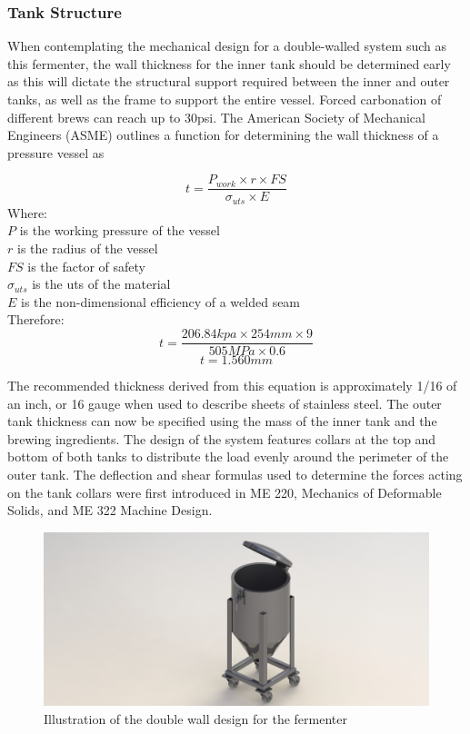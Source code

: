 \documentclass{article}
\begin{document}
\subsubsection{Tank Structure}
When contemplating the mechanical design for a double-walled system such as this fermenter, the wall thickness for the inner tank should be determined early as this will dictate the structural support required between the inner and outer tanks, as well as the frame to support the entire vessel. Forced carbonation of different brews can reach up to 30psi.  The American Society of Mechanical Engineers (ASME) outlines a function for determining the wall thickness of a pressure vessel as

\begin{equation}
t = \frac{P_{work} \times r \times FS}{\sigma_{uts} \times E}
\end{equation}
\noindent Where: \\
$P$ is the working pressure of the vessel\\
$r$ is the radius of the vessel\\
$FS$ is the factor of safety\\
$­\sigma_{uts}$ is the \gls{uts} of the material\\
$E$ is the non-dimensional efficiency of a welded seam\\

\noindent Therefore:
\begin{equation}
t = \frac{206.84kpa \times 254mm \times 9}{505MPa \times 0.6}
\end{equation}
\begin{equation}
t = 1.560mm
\end{equation}

The recommended thickness derived from this equation is approximately 1/16 of an inch, or 16 gauge when used to describe sheets of stainless steel.
The outer tank thickness can now be specified using the mass of the inner tank and the brewing ingredients.  The design of the system features collars at the top and bottom of both tanks to distribute the load evenly around the perimeter of the outer tank.  The deflection and shear formulas used to determine the forces acting on the tank collars were first introduced in ME 220, Mechanics of Deformable Solids, and ME 322 Machine Design.

\begin{figure}[H]
\begin{center}
\includegraphics[scale=0.25]{fermenter-cad.png}
\caption{Illustration of the double wall design for the fermenter}
\label{fig:fermenter-cad}
\end{center}
\end{figure}
\end{document}
